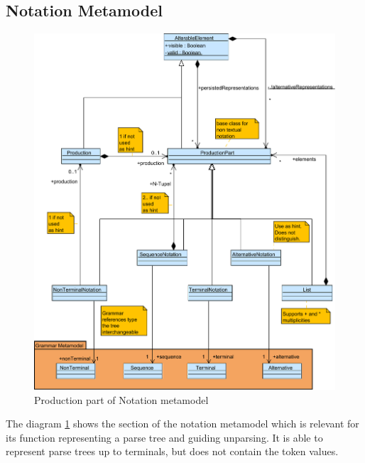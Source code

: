 \subsection{Notation Metamodel}
\begin{figure}
\centering
\includegraphics[scale=0.65]{gfx/ex/Notation_Prod} 
\caption{Production part of Notation metamodel}
\label{MM:Not:Prod}
\end{figure}

The diagram \ref{MM:Not:Prod} shows the section of the notation metamodel which is relevant for its function representing a parse tree and guiding unparsing. It is able to represent parse trees up to terminals, but does not contain the token values.\\

